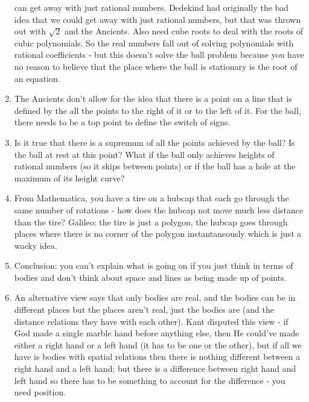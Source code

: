 \documentclass[12pt]{article}
\theoremstyle{definition}
\begin{document}
\begin{enumerate}
        can get away with just rational numbers. Dedekind had originally the
        bad idea that we could get away with just rational numbers, but that
        was thrown out with $\sqrt{2}$ and the Ancients. Also need cube roots
        to deal with the roots of cubic polynomials. So the real numbers fall
        out of solving polynomials with rational coefficients - but this
        doesn't solve the ball problem because you have no reason to believe
        that the place where the ball is stationary is the root of an equation.
    \item 
        The Ancients don't allow for the idea that there is a point on a line
        that is defined by the all the points to the right of it or to the left
        of it. For the ball, there needs to be a top point to define the switch
        of signs.
    \item
        Is it true that there is a supremum of all the points achieved by the
        ball? Is the ball at rest at this point? What if the ball only achieves
        heights of rational numbers (so it skips between points) or if the ball
        has a hole at the maximum of its height curve?
    \item
        From Mathematica, you have a tire on a hubcap that each go through the
        same number of rotations - how does the hubcap not move much less
        distance than the tire? Galileo: the tire is just a polygon, the hubcap
        goes through places where there is no corner of the polygon
        instantaneously which is just a wacky idea.
    \item 
        Conclusion: you can't explain what is going on if you just think in
        terms of bodies and don't think about space and lines as being made up
        of points.
    \item
        An alternative view says that only bodies are real, and the bodies can
        be in different places but the places aren't real, just the bodies are
        (and the distance relations they have with each other). Kant disputed
        this view - if God made a single marble hand before anything else, then
        He could've made either a right hand or a left hand (it has to be one
        or the other), but if all we have is bodies with spatial relations then
        there is nothing different between a right hand and a left hand; but
        there is a difference between right hand and left hand so there has to
        be something to account for the difference - you need position.
\end{enumerate}
\end{document}
